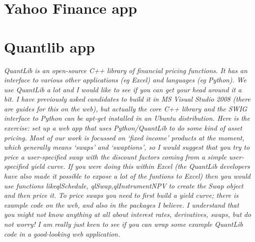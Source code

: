 \documentclass{article}
\begin{document}
\section{Yahoo Finance app}
\section{Quantlib app}
\emph{
QuantLib is an open-source C++ library of financial pricing functions. It has an interface to various other applications (eg Excel) and languages (eg Python).
We use QuantLib a lot and I would like to see if you can get your head around it a bit.
I have previously asked candidates to build it in MS Visual Studio 2008 (there are guides for this on the web), but actually the core C++ library and the SWIG interface to Python can be apt-get installed in an Ubuntu distribution.
Here is the exercise: set up a web app that uses Python/QuantLib to do some kind of asset pricing.
Most of our work is focussed on ‘fixed income’ products at the moment, which generally means ‘swaps’ and ‘swaptions’, so I would suggest that you try to price a user-specified swap with the discount factors coming from a simple user-specified yield curve.
If you were doing this within Excel (the QuantLib developers have also made it possible to expose a lot of the funtions to Excel) then you would use functions likeqlSchedule, qlSwap,qlInstrumentNPV to create the Swap object and then price it.
To price swaps you need to first build a yield curve; there is example code on the web, and also in the packages I believe.
I understand that you might not know anything at all about interest rates, derivatives, swaps, but do not worry! I am really just keen to see if you can wrap some example QuantLib code in a good-looking web application.}
\end{document}
